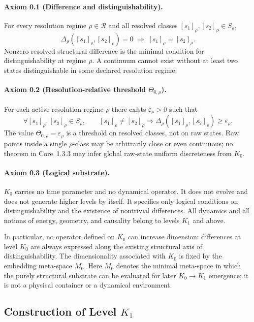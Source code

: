 \paragraph{Axiom 0.1 (Difference and distinguishability).}
For every resolution regime \(\rho\in\mathcal{R}\) and all resolved classes
\([s_1]_\rho,[s_2]_\rho\in S_\rho\),
\[
    \Delta_\rho([s_1]_\rho,[s_2]_\rho) = 0
    \;\Rightarrow\;
    [s_1]_\rho = [s_2]_\rho.
\]
Nonzero resolved structural difference is the minimal condition for
distinguishability at regime \(\rho\). A continuum cannot exist without at
least two states distinguishable in some declared resolution regime.

\paragraph{Axiom 0.2 (Resolution-relative threshold \texorpdfstring{$\Theta_{0,\rho}$}{Theta\_0,rho}).}
For each active resolution regime \(\rho\) there exists
\(\varepsilon_\rho>0\) such that
\[
    \forall [s_1]_\rho,[s_2]_\rho\in S_\rho,\qquad
    [s_1]_\rho\neq [s_2]_\rho
    \Rightarrow
    \Delta_\rho([s_1]_\rho,[s_2]_\rho)\ge\varepsilon_\rho.
\]
The value \(\Theta_{0,\rho}=\varepsilon_\rho\) is a threshold on resolved
classes, not on raw states. Raw points inside a single \(\rho\)-class may be
arbitrarily close or even continuous; no theorem in Core~1.3.3 may infer
global raw-state uniform discreteness from \(K_0\).

\paragraph{Axiom 0.3 (Logical substrate).}
\(K_0\) carries no time parameter and no dynamical operator.
It does not evolve and does not generate higher levels by itself.
It specifies only logical conditions on distinguishability and the existence of nontrivial differences.
All dynamics and all notions of energy, geometry, and causality belong to levels \(K_1\) and above.

In particular, no operator defined on \(K_0\) can increase dimension:
differences at level \(K_0\) are always expressed along the existing structural axis of distinguishability.
The dimensionality associated with \(K_0\) is fixed by the embedding meta-space \(M_0\).
Here \(M_0\) denotes the minimal meta-space in which the purely structural
substrate can be evaluated for later \(K_0\to K_1\) emergence; it is not a
physical container or a dynamical environment.

\subsection{Construction of Level \texorpdfstring{$K_1$}{K\_1}}

